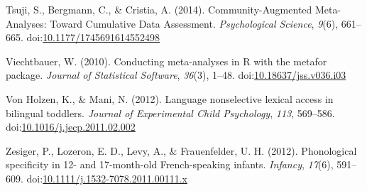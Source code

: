 \documentclass[man]{apa6}
\theoremstyle{definition}
\theoremstyle{definition}
\theoremstyle{definition}
\theoremstyle{remark}
\begin{document}
\hypertarget{ref-Tsuji2014}{}
Tsuji, S., Bergmann, C., \& Cristia, A. (2014). Community-Augmented
Meta-Analyses: Toward Cumulative Data Assessment. \emph{Psychological
Science}, \emph{9}(6), 661--665.
doi:\href{https://doi.org/10.1177/1745691614552498}{10.1177/1745691614552498}

\hypertarget{ref-metafor}{}
Viechtbauer, W. (2010). Conducting meta-analyses in R with the metafor
package. \emph{Journal of Statistical Software}, \emph{36}(3), 1--48.
doi:\href{https://doi.org/10.18637/jss.v036.i03}{10.18637/jss.v036.i03}

\hypertarget{ref-VonHolzen2012}{}
Von Holzen, K., \& Mani, N. (2012). Language nonselective lexical access
in bilingual toddlers. \emph{Journal of Experimental Child Psychology},
\emph{113}, 569--586.
doi:\href{https://doi.org/10.1016/j.jecp.2011.02.002}{10.1016/j.jecp.2011.02.002}

\hypertarget{ref-Zesiger2012}{}
Zesiger, P., Lozeron, E. D., Levy, A., \& Frauenfelder, U. H. (2012).
Phonological specificity in 12- and 17-month-old French-speaking
infants. \emph{Infancy}, \emph{17}(6), 591--609.
doi:\href{https://doi.org/10.1111/j.1532-7078.2011.00111.x}{10.1111/j.1532-7078.2011.00111.x}

\endgroup
\end{document}
